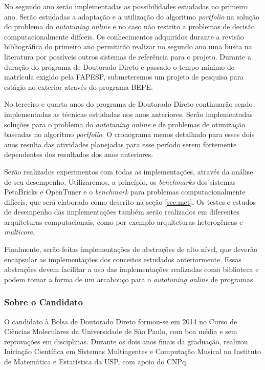\documentclass[a4paper, 12pt]{article}
\begin{document}
No segundo ano serão implementadas as possibilidades estudadas no primeiro ano.
Serão estudadas a adaptação e a utilização do algoritmo \emph{portfolio} na 
solução do problema do \emph{autotuning online} e no caso não restrito a 
problemas de decisão computacionalmente difíceis. Os conhecimentos adquiridos
durante a revisão bibliográfica do primeiro ano permitirão realizar no segundo 
ano uma busca na literatura por possíveis outros sistemas de referência para o 
projeto. Durante a duração do programa de Doutorado Direto e passado o tempo 
mínimo de matrícula exigido pela FAPESP, submeteremos um projeto de pesquisa 
para estágio no exterior através do programa BEPE.

No terceiro e quarto anos do programa de Doutorado Direto continuarão sendo 
implementadas as técnicas estudadas nos anos anteriores. Serão implementadas
soluções para o problema do \emph{autotuning online} e de problemas de 
otimização baseadas no algoritmo \emph{portfolio}. O cronograma menos detalhado
para esses dois anos resulta das atividades planejadas para esse período serem
fortemente dependentes dos resultados dos anos anteriores.

Serão realizados experimentos com todas as implementações, através da análise 
de seu desempenho. Utilizaremos, a princípio, os \emph{benchmarks} dos sistemas
PetaBricks e OpenTuner e o \emph{benchmark} para problemas computacionalmente
difíceis, que será elaborado como descrito na seção \ref{sec:met}. 
Os testes e estudos de desempenho das implementações também serão realizados 
em diferentes arquiteturas computacionais, como por exemplo arquiteturas 
heterogêneas e \emph{multicore}. 

Finalmente, serão feitas implementações de abstrações de alto
nível, que deverão encapsular as implementações dos conceitos estudados 
anteriormente. Essas abstrações devem facilitar a uso das implementações 
realizadas como biblioteca e podem tomar a forma de um arcabouço para o 
\emph{autotuning online} de programas.

\subsubsection{Sobre o Candidato}

O candidato à Bolsa de Doutorado Direto formou-se em 2014 no Curso de Ciências
Moleculares da Universidade de São Paulo, com boa média e sem reprovações em
disciplinas. Durante os dois anos finais da graduação, realizou Iniciação 
Científica em Sistemas Multiagentes e Computação Musical no Instituto de 
Matemática e Estatística da USP, com apoio do CNPq. 
\end{document}
